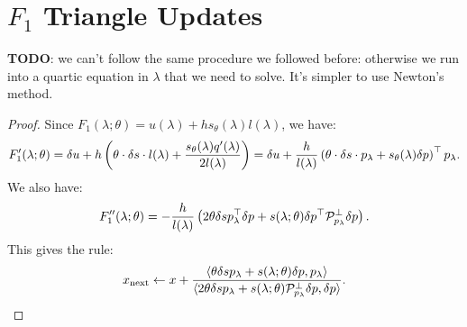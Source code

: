 \documentclass[eikonal.tex]{subfiles}
\begin{document}
\section{$F_1$ Triangle Updates}

\textbf{TODO}: we can't follow the same procedure we followed before:
otherwise we run into a quartic equation in $\lambda$ that we need to
solve. It's simpler to use Newton's method.

\begin{proof}
  Since
  $F_1(\lambda; \theta) = u(\lambda) + h s_\theta(\lambda)
  l(\lambda)$, we have:
  \begin{align*}
    F_1'(\lambda; \theta) = \delta u + h \left(\theta \cdot \delta s \cdot l(\lambda) + \frac{s_\theta(\lambda) q'(\lambda)}{2 l(\lambda)}\right) = \delta u + \frac{h}{l(\lambda)} \left(\theta \cdot \delta s \cdot p_\lambda + s_\theta(\lambda) \delta p\right)^\top p_\lambda.
  \end{align*}
  We also have:
  \begin{align*}
    F_1''(\lambda; \theta) = -\frac{h}{l(\lambda)} \left(2 \theta \delta s p_\lambda^\top \delta p + s(\lambda; \theta) \delta p^\top \mathcal{P}_{p_\lambda}^\perp \delta p\right).
  \end{align*}
  This gives the rule:
  \begin{align*}
    x_{\operatorname{next}} \gets x + \frac{\langle \theta \delta s p_\lambda + s(\lambda; \theta) \delta p, p_\lambda \rangle}{\langle 2 \theta \delta s p_\lambda + s(\lambda; \theta) \mathcal{P}^\perp_{p_\lambda} \delta p, \delta p \rangle}.
  \end{align*}
\end{proof}
\end{document}

